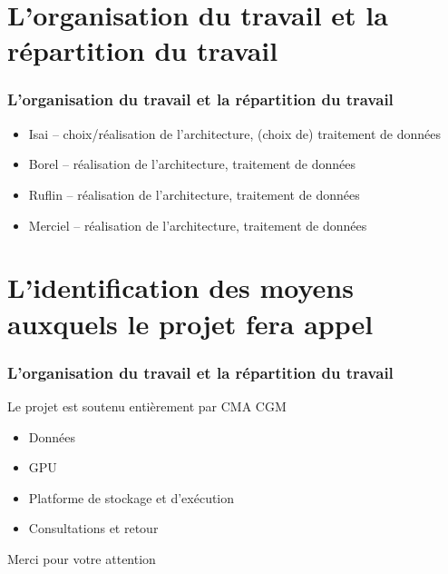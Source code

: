 \documentclass{beamer}
\begin{document}
\section{L’organisation du travail et la répartition du travail}

		\begin{frame}
		\frametitle{L’organisation du travail et la répartition du travail}
		\begin{itemize}
			\item Isai – choix/réalisation de l'architecture, (choix de) traitement de données
			\item Borel – réalisation de l'architecture, traitement de données
			\item Ruflin – réalisation de l'architecture, traitement de données
			\item Merciel – réalisation de l'architecture, traitement de données
		\end{itemize}
	
	
	\end{frame}

\section{L’identification des moyens auxquels le projet fera appel}

		\begin{frame}
	\frametitle{L’organisation du travail et la répartition du travail}
	Le projet est soutenu entièrement par CMA CGM
	\begin{itemize}
		\item Données
		\item GPU
		\item Platforme de stockage et d'exécution 
		\item Consultations et retour
	\end{itemize}
	
	
\end{frame}
	

	\begin{frame}
	\begin{center}
{\LARGE Merci pour votre attention }
	\end{center}
\end{frame}



	
\end{document}
